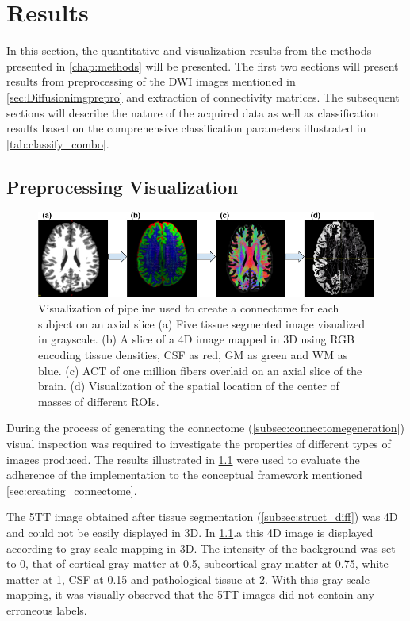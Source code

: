 \documentclass[msthesis.tex]{subfiles}
\begin{document}
\chapter{Results}
\label{chap:results}
In this section, the quantitative and visualization results from the methods presented in \autoref{chap:methods} will be presented. The first two sections will present results from preprocessing of the \gls{DWI} images mentioned in \autoref{sec:Diffusionimgprepro} and extraction of connectivity matrices. The subsequent sections will describe the nature of the acquired data as well as classification results based on the comprehensive classification parameters illustrated in \autoref{tab:classify_combo}.

\section{Preprocessing Visualization}
\begin{figure}
    \centering
    \includegraphics[width=\textwidth]{images/Preprocessing_pipeline.png}
    \caption{Visualization of pipeline used to create a connectome for each subject on an axial slice (a) Five tissue segmented image visualized in grayscale. (b) A slice of a 4D image mapped in 3D using RGB encoding tissue densities, CSF as red, GM as green and WM as blue. (c) \gls{ACT} of one million fibers overlaid on an axial slice of the brain. (d) Visualization of the spatial location of the center of masses of different \gls{ROI}s.}
    \label{fig:preproc}
\end{figure}

During the process of generating the connectome (\autoref{subsec:connectomegeneration}) visual inspection was required to investigate the properties of different types of images produced. The results illustrated in \cref{fig:preproc} were used to evaluate the adherence of the implementation to the conceptual framework mentioned \autoref{sec:creating_connectome}. 

The \gls{5TT} image obtained after tissue segmentation (\autoref{subsec:struct_diff}) was 4D and could not be easily displayed in 3D. In \cref{fig:preproc}.a this 4D image is displayed according to gray-scale mapping in 3D. The intensity of the background was set to 0,  that of cortical gray matter at 0.5, subcortical gray matter at 0.75, white matter at 1, CSF at 0.15 and pathological tissue at 2. With this gray-scale mapping, it was visually observed that the \gls{5TT} images did not contain any erroneous labels.
\end{document}

